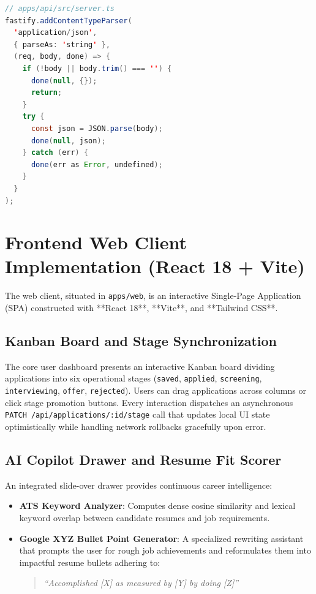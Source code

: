 \begin{lstlisting}[language=Java, caption={Custom Fastify Empty-Body JSON Parser}]
// apps/api/src/server.ts
fastify.addContentTypeParser(
  'application/json',
  { parseAs: 'string' },
  (req, body, done) => {
    if (!body || body.trim() === '') {
      done(null, {});
      return;
    }
    try {
      const json = JSON.parse(body);
      done(null, json);
    } catch (err) {
      done(err as Error, undefined);
    }
  }
);
\end{lstlisting}

\section{Frontend Web Client Implementation (React 18 + Vite)}
The web client, situated in \texttt{apps/web}, is an interactive Single-Page Application (SPA) constructed with **React 18**, **Vite**, and **Tailwind CSS**.

\subsection{Kanban Board and Stage Synchronization}
The core user dashboard presents an interactive Kanban board dividing applications into six operational stages (\texttt{saved}, \texttt{applied}, \texttt{screening}, \texttt{interviewing}, \texttt{offer}, \texttt{rejected}). Users can drag applications across columns or click stage promotion buttons. Every interaction dispatches an asynchronous \texttt{PATCH /api/applications/:id/stage} call that updates local UI state optimistically while handling network rollbacks gracefully upon error.

\subsection{AI Copilot Drawer and Resume Fit Scorer}
An integrated slide-over drawer provides continuous career intelligence:
\begin{itemize}
    \item \textbf{ATS Keyword Analyzer}: Computes dense cosine similarity and lexical keyword overlap between candidate resumes and job requirements.
    \item \textbf{Google XYZ Bullet Point Generator}: A specialized rewriting assistant that prompts the user for rough job achievements and reformulates them into impactful resume bullets adhering to:
    \begin{quote}
        \textit{``Accomplished [X] as measured by [Y] by doing [Z]''}
    \end{quote}
\end{itemize}

